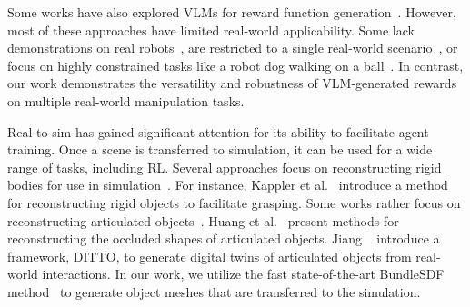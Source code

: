 Some works have also explored VLMs for reward function generation~\cite{yu2023language, ma2023eureka, ma2024dreurekalanguagemodelguided,xie2023text2reward}. However, most of these approaches have limited real-world applicability. Some lack demonstrations on real robots~\cite{ma2023eureka}, are restricted to a single real-world scenario~\cite{xie2023text2reward}, or focus on highly constrained tasks like a robot dog walking on a ball~\cite{ma2024dreurekalanguagemodelguided}. In contrast, our work demonstrates the versatility and robustness of VLM-generated rewards on multiple real-world manipulation tasks.


Real-to-sim has gained significant attention for its ability to facilitate agent training. Once a scene is transferred to simulation, it can be used for a wide range of tasks, including RL. Several approaches focus on reconstructing rigid bodies for use in simulation~\cite{kappler2018real,wen2022you,liu2024one,xu2025sparp,shi2023zero123++,liu2023zero,gao2022get3d}. For instance, Kappler et al.~\cite{kappler2018real} introduce a method for reconstructing rigid objects to facilitate grasping. 
Some works rather focus on reconstructing articulated objects~\cite{mu2021sdf,jiang2022ditto,nie2022structure,chen2024urdformer,mandi2024real2code,liu2023paris,liu2024cage,liu2024singapo}. Huang et al.~\cite{huang2012occlusion} present methods for reconstructing the occluded shapes of articulated objects. Jiang \etal~\cite{jiang2022ditto} introduce a framework, DITTO, to generate digital twins of articulated objects from real-world interactions. In our work, we utilize the fast state-of-the-art BundleSDF method~\cite{wen2023bundlesdf} to generate object meshes that are transferred to the simulation. 

